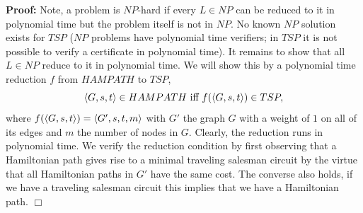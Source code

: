 \documentclass[a4paper,blends,pdf,colorBG,slideColor]{prosper}
\begin{document}
{\small
{}
{\bf Proof:}  Note, a problem is $NP$-hard if every $L \in NP$ can be reduced to it in polynomial time but the problem itself is not in $NP$.  No known $NP$ solution exists for $TSP$ ($NP$ problems have polynomial time verifiers; in $TSP$ it is not possible to verify a certificate in polynomial time).  It remains to show that all $L \in NP$ reduce to it in polynomial time.  We will show this by a polynomial time reduction  $f$ from $HAMPATH$  to $TSP$,
\[
\langle {G,s,t} \rangle \in HAMPATH \mbox{ iff } f(\langle {G,s,t} \rangle) \in TSP,
\]
where $f(\langle {G,s,t} \rangle) = \langle {G',s,t,m} \rangle$ with $G'$ the graph $G$ with a weight of $1$ on all of its edges
and $m$  the number of nodes in $G$.  Clearly, the reduction runs in polynomial time.  We verify the reduction condition by first observing that a Hamiltonian path gives rise to a minimal traveling salesman circuit by the virtue that all Hamiltonian paths in $G'$ have the same cost.  The converse also holds, if we have a traveling salesman circuit this implies that we have a Hamiltonian path. $\Box$
}
\es
\end{document}
